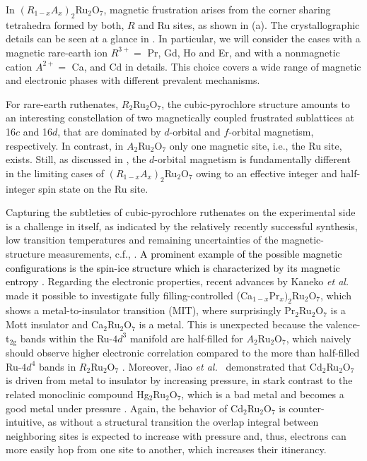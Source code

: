 \documentclass[10pt]{iopart}
\newcommand{\red}[1]{\textcolor{black}{#1}}
\begin{document}
In $(R_{1-x}A_x)_2$Ru$_2$O$_7$, magnetic frustration arises from the corner sharing tetrahedra formed by both, $R$ and Ru sites, as shown in  (a). The crystallographic details can be seen at a glance in . 
In particular, we will consider the cases with a magnetic rare-earth ion $R^{3+}=$ Pr, Gd, Ho and Er, and with a nonmagnetic cation $A^{2+}=$ Ca, and Cd in details. This choice covers a wide range of magnetic and electronic phases with different prevalent mechanisms.

For rare-earth ruthenates, $R_2$Ru$_2$O$_7$, the cubic-pyrochlore structure amounts to an interesting constellation of two magnetically coupled frustrated sublattices at 16$c$ and 16$d$, that are dominated by $d$-orbital and $f$-orbital magnetism, respectively. 
In contrast, in $A_2$Ru$_2$O$_7$ only one magnetic site, i.e., the Ru site, exists. Still, as discussed in , the $d$-orbital magnetism is fundamentally different in the limiting cases of $(R_{1-x}A_x)_2$Ru$_2$O$_7$ owing to an effective integer and half-integer spin state on the Ru site.

Capturing the subtleties of cubic-pyrochlore ruthenates on the experimental side is a challenge in itself, as indicated by the relatively recently successful synthesis, low transition temperatures and remaining uncertainties of the magnetic-structure measurements, c.f., . 
\red{A prominent example of the possible magnetic configurations is the spin-ice structure which is characterized by its magnetic entropy \cite{bramwell2001science,gardner2005spin}.}
Regarding the electronic properties, recent advances by Kaneko \emph{et al.\ }\cite{kaneko2021fully} made it possible to investigate fully filling-controlled (Ca$_{1-x}$Pr$_x)_2$Ru$_2$O$_7$, which shows a metal-to-insulator transition (MIT), where surprisingly Pr$_2$Ru$_2$O$_7$ is a Mott insulator and Ca$_2$Ru$_2$O$_7$ is a metal. This is unexpected because the valence-t$_{2\mathrm{g}}$ bands within the Ru-$4d^3$ manifold are half-filled for $A_2$Ru$_2$O$_7$, which naively should observe higher electronic correlation compared to the more than half-filled Ru-$4d^4$ bands in $R_2$Ru$_2$O$_7$ \cite{georges2013strong}. Moreover, Jiao \emph{et al.\ }\cite{jiao2018effect} demonstrated that Cd$_2$Ru$_2$O$_7$ is driven from metal to insulator by increasing pressure, in stark contrast to the related monoclinic compound Hg$_2$Ru$_2$O$_7$, which is a bad metal and becomes a good metal under pressure \cite{takeshita2007pressure}. Again, the behavior of Cd$_2$Ru$_2$O$_7$ is counter-intuitive, as without a structural transition the overlap integral between neighboring sites is expected to increase with pressure and, thus, electrons can more easily hop from one site to another, which increases their itinerancy. 
\end{document}
